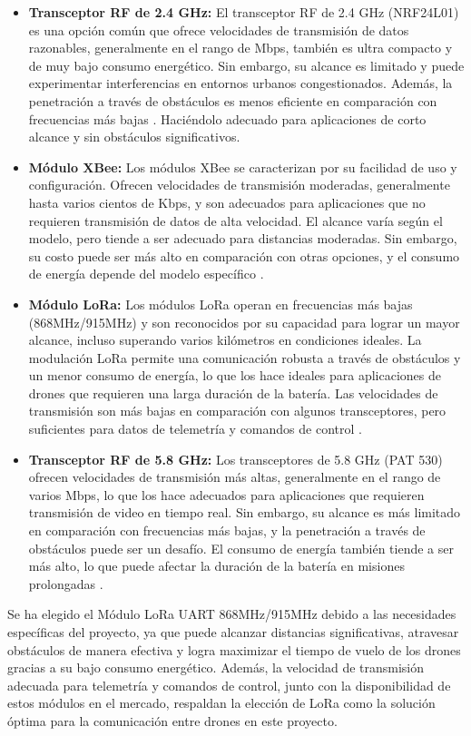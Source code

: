 \begin{itemize}
\item \textbf{Transceptor RF de 2.4 GHz:} El transceptor RF de 2.4 GHz (NRF24L01) es una opción común que ofrece velocidades de transmisión de datos razonables, generalmente en el rango de Mbps, también es ultra compacto y de muy bajo consumo energético. Sin embargo, su alcance es limitado y puede experimentar interferencias en entornos urbanos congestionados. Además, la penetración a través de obstáculos es menos eficiente en comparación con frecuencias más bajas \cite{nrf24}. Haciéndolo adecuado para aplicaciones de corto alcance y sin obstáculos significativos.
\item \textbf{Módulo XBee:} Los módulos XBee se caracterizan por su facilidad de uso y configuración. Ofrecen velocidades de transmisión moderadas, generalmente hasta varios cientos de Kbps, y son adecuados para aplicaciones que no requieren transmisión de datos de alta velocidad. El alcance varía según el modelo, pero tiende a ser adecuado para distancias moderadas. Sin embargo, su costo puede ser más alto en comparación con otras opciones, y el consumo de energía depende del modelo específico \cite{xbee}.
\item \textbf{Módulo LoRa:} Los módulos LoRa operan en frecuencias más bajas (868MHz/915MHz) y son reconocidos por su capacidad para lograr un mayor alcance, incluso superando varios kilómetros en condiciones ideales. La modulación LoRa permite una comunicación robusta a través de obstáculos y un menor consumo de energía, lo que los hace ideales para aplicaciones de drones que requieren una larga duración de la batería. Las velocidades de transmisión son más bajas en comparación con algunos transceptores, pero suficientes para datos de telemetría y comandos de control \cite{lora}.
\item \textbf{Transceptor RF de 5.8 GHz:} Los transceptores de 5.8 GHz (PAT 530) ofrecen velocidades de transmisión más altas, generalmente en el rango de varios Mbps, lo que los hace adecuados para aplicaciones que requieren transmisión de video en tiempo real. Sin embargo, su alcance es más limitado en comparación con frecuencias más bajas, y la penetración a través de obstáculos puede ser un desafío. El consumo de energía también tiende a ser más alto, lo que puede afectar la duración de la batería en misiones prolongadas \cite{t58}.
\end{itemize}

Se ha elegido el Módulo LoRa UART 868MHz/915MHz debido a las necesidades específicas del proyecto, ya que puede alcanzar distancias significativas, atravesar obstáculos de manera efectiva y logra maximizar el tiempo de vuelo de los drones gracias a su bajo consumo energético. Además, la velocidad de transmisión adecuada para telemetría y comandos de control, junto con la disponibilidad de estos módulos en el mercado, respaldan la elección de LoRa como la solución óptima para la comunicación entre drones en este proyecto.

